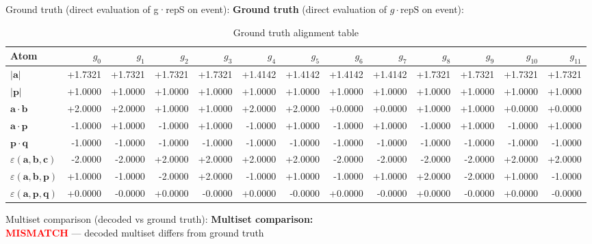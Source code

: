 \documentclass[a4paper,11pt]{article}
\newcommand{\vc}[1]{\ensuremath{\mathbf{#1}}}
\newcommand{\dnfagmiihhiejm}[1]{|\vc{#1}|}
\newcommand{\pdcegfomjfhook}[2]{\mathbf{#1} \cdot \mathbf{#2}}
\newcommand{\kblbmcpggoncpf}[3]{\varepsilon(\mathbf{#1},\mathbf{#2},\mathbf{#3})}
\begin{document}
  Ground truth  (direct evaluation of g·repS on event):
\textbf{Ground truth} (direct evaluation of $g \cdot \text{repS}$ on event):\\
\begin{table}[h]\centering
\caption{Ground truth alignment table}
\begin{tabular}{lrrrrrrrrrrrr}
\toprule
Atom & $g_{0}$ & $g_{1}$ & $g_{2}$ & $g_{3}$ & $g_{4}$ & $g_{5}$ & $g_{6}$ & $g_{7}$ & $g_{8}$ & $g_{9}$ & $g_{10}$ & $g_{11}$ \\
\midrule
$\dnfagmiihhiejm{a}$ & +1.7321 & +1.7321 & +1.7321 & +1.7321 & +1.4142 & +1.4142 & +1.4142 & +1.4142 & +1.7321 & +1.7321 & +1.7321 & +1.7321 \\
$\dnfagmiihhiejm{p}$ & +1.0000 & +1.0000 & +1.0000 & +1.0000 & +1.0000 & +1.0000 & +1.0000 & +1.0000 & +1.0000 & +1.0000 & +1.0000 & +1.0000 \\
$\pdcegfomjfhook{a}{b}$ & +2.0000 & +2.0000 & +1.0000 & +1.0000 & +2.0000 & +2.0000 & +0.0000 & +0.0000 & +1.0000 & +1.0000 & +0.0000 & +0.0000 \\
$\pdcegfomjfhook{a}{p}$ & -1.0000 & +1.0000 & -1.0000 & +1.0000 & -1.0000 & +1.0000 & -1.0000 & +1.0000 & -1.0000 & +1.0000 & -1.0000 & +1.0000 \\
$\pdcegfomjfhook{p}{q}$ & -1.0000 & -1.0000 & -1.0000 & -1.0000 & -1.0000 & -1.0000 & -1.0000 & -1.0000 & -1.0000 & -1.0000 & -1.0000 & -1.0000 \\
$\kblbmcpggoncpf{a}{b}{c}$ & -2.0000 & -2.0000 & +2.0000 & +2.0000 & +2.0000 & +2.0000 & -2.0000 & -2.0000 & -2.0000 & -2.0000 & +2.0000 & +2.0000 \\
$\kblbmcpggoncpf{a}{b}{p}$ & +1.0000 & -1.0000 & -2.0000 & +2.0000 & -1.0000 & +1.0000 & -1.0000 & +1.0000 & +2.0000 & -2.0000 & +1.0000 & -1.0000 \\
$\kblbmcpggoncpf{a}{p}{q}$ & +0.0000 & -0.0000 & +0.0000 & -0.0000 & +0.0000 & -0.0000 & +0.0000 & -0.0000 & +0.0000 & -0.0000 & +0.0000 & -0.0000 \\
\bottomrule\end{tabular}\end{table}

  Multiset comparison  (decoded vs ground truth):
\textbf{Multiset comparison:}\\
\textcolor{red}{\textbf{MISMATCH}} — decoded multiset differs from ground truth
\end{document}
